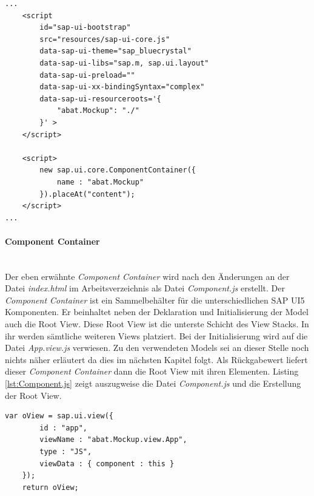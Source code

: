 \vspace{2em}
\begin{lstlisting}[frame=htrbl, caption=Bootstrapping der SAP UI5 Applikation, label=lst:bootstrapping]
...
	<script
		id="sap-ui-bootstrap"
		src="resources/sap-ui-core.js"
		data-sap-ui-theme="sap_bluecrystal"
		data-sap-ui-libs="sap.m, sap.ui.layout"
		data-sap-ui-preload="" 
		data-sap-ui-xx-bindingSyntax="complex"
		data-sap-ui-resourceroots='{
			"abat.Mockup": "./"
		}' >
	</script>

	<script>
		new sap.ui.core.ComponentContainer({
			name : "abat.Mockup"
		}).placeAt("content");
	</script>
...
\end{lstlisting}
	
\paragraph{Component Container}$\;$ \\
Der eben erwähnte \textit{Component Container} wird nach den Änderungen an der Datei \textit{index.html} im Arbeitsverzeichnis als Datei \textit{Component.js} erstellt. Der \textit{Component Container} ist ein Sammelbehälter für die unterschiedlichen SAP UI5 Komponenten. Er beinhaltet neben der Deklaration und Initialisierung der Model auch die Root View. Diese Root View ist die unterste Schicht des View Stacks. In ihr werden sämtliche weiteren Views platziert. Bei der Initialisierung wird auf die Datei \textit{App.view.js} verwiesen. Zu den verwendeten Models sei an dieser Stelle noch nichts näher erläutert da dies im nächsten Kapitel folgt. Als Rückgabewert liefert dieser \textit{Component Container} dann die Root View mit ihren Elementen. Listing \ref{lst:Component.js} zeigt auszugweise die Datei \textit{Component.js} und die Erstellung der Root View.

\vspace{1em}
\begin{lstlisting}[frame=htrbl, caption=Auszug aus der Component.js, label=lst:Component.js]
	var oView = sap.ui.view({
		id : "app",
		viewName : "abat.Mockup.view.App",
		type : "JS",
		viewData : { component : this }
	});
	return oView;
\end{lstlisting}
	
